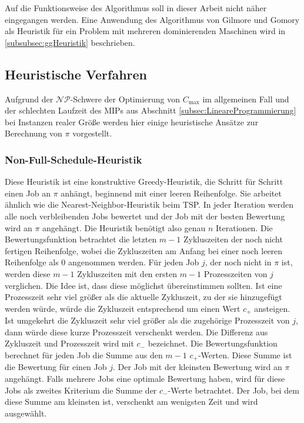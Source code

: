 \documentclass{scrreprt}
\begin{document}
Auf die Funktionsweise des Algorithmus soll in dieser Arbeit nicht näher eingegangen werden.
Eine Anwendung des Algorithmus von Gilmore und Gomory als Heuristik für ein Problem mit mehreren dominierenden Maschinen wird in
\ref{subsubsec:ggHeuristik} beschrieben.


\subsection{Heuristische Verfahren}
\label{subsec:HeuristischeVerfahren}
Aufgrund der $\mathcal{NP}$-Schwere der Optimierung von $C_{\max}$ im allgemeinen Fall und der schlechten Laufzeit des MIPs aus Abschnitt \ref{subsec:LineareProgrammierung}
bei Instanzen realer Größe werden hier einige heuristische Ansätze zur Berechnung von $\pi$ vorgestellt.

\subsubsection{Non-Full-Schedule-Heuristik}
Diese Heuristik ist eine konstruktive Greedy-Heuristik, die Schritt für Schritt einen Job an $\pi$ anhängt, beginnend mit einer leeren Reihenfolge.
Sie arbeitet ähnlich wie die Nearest-Neighbor-Heuristik beim TSP.
In jeder Iteration werden alle noch verbleibenden Jobs bewertet und der Job mit der besten Bewertung wird an $\pi$ angehängt.
Die Heuristik benötigt also genau $n$ Iterationen.
Die Bewertungsfunktion betrachtet die letzten $m-1$ Zykluszeiten der noch nicht fertigen Reihenfolge, 
wobei die Zykluszeiten am Anfang bei einer noch leeren Reihenfolge als $0$ angenommen werden.
Für jeden Job $j$, der noch nicht in $\pi$ ist, werden diese $m-1$ Zykluszeiten mit den ersten $m-1$ Prozesszeiten von $j$ verglichen.
Die Idee ist, dass diese möglichst übereinstimmen sollten. Ist eine Prozesszeit sehr viel größer als die aktuelle Zykluszeit,
zu der sie hinzugefügt werden würde, würde die Zykluszeit entsprechend um einen Wert $c_+$ ansteigen.
Ist umgekehrt die Zykluszeit sehr viel größer als die zugehörige Prozesszeit von $j$, dann würde diese kurze Prozesszeit verschenkt werden.
Die Differenz aus Zykluszeit und Prozesszeit wird mit $c_-$ bezeichnet.
Die Bewertungsfunktion berechnet für jeden Job die Summe aus den $m-1$ $c_+$-Werten.
Diese Summe ist die Bewertung für einen Job $j$. Der Job mit der kleinsten Bewertung wird an $\pi$ angehängt.
Falls mehrere Jobs eine optimale Bewertung haben, wird für diese Jobs als zweites Kriterium die Summe der $c_-$-Werte betrachtet.
Der Job, bei dem diese Summe am kleinsten ist, verschenkt am wenigsten Zeit und wird ausgewählt.
\end{document}
